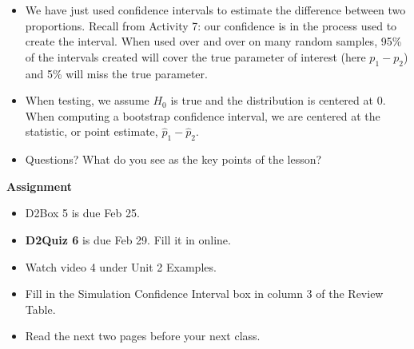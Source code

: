 \begin{itemize}
  \item We have just used confidence intervals 
    to estimate the difference between two proportions.  Recall from
    Activity 7: our confidence is in the process used to create the
    interval.  When used over and over on many random samples, 95\% of
    the intervals created will cover the true parameter of interest
    (here $p_1 - p_2$) and 5\% will miss the true parameter.

  \item When testing, we assume $H_0$ is true and the distribution is
    centered at 0.  When computing a bootstrap confidence interval, we
    are centered at the statistic, or point estimate, $\widehat{p}_1 -
    \widehat{p}_2$. 
 \item 
  Questions? What do you see as the key points of the lesson? \vfill

  \end{itemize}






\noindent
{\bf Assignment} \vspace{-.2in}
\begin{itemize}
\item  D2Box 5 is due Feb 25.
\item {\bf D2Quiz 6} is due Feb 29.  Fill it in online.
\item Watch video 4 under Unit 2 Examples.
\item Fill in the Simulation Confidence Interval box in column 3 of
  the Review Table. 
\item Read the next two pages before your next class.
\end{itemize}

